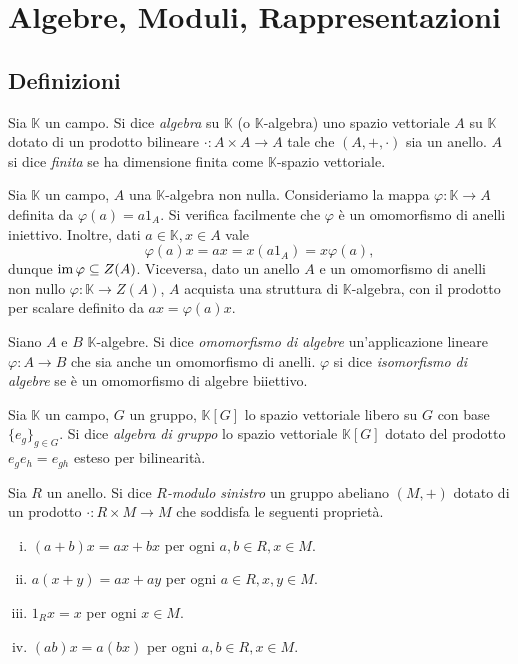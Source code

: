 \chapter{Algebre, Moduli, Rappresentazioni}

\section{Definizioni}

\begin{definition}
Sia $\mathbb{K}$ un campo. Si dice \emph{algebra} su $\mathbb{K}$ (o $\mathbb{K}$-algebra) uno spazio vettoriale $A$ su $\mathbb{K}$ dotato di un prodotto bilineare $\cdot:A\times A\to A$ tale che $(A,+,\cdot)$ sia un anello. $A$ si dice \emph{finita} se ha dimensione finita come $\mathbb{K}$-spazio vettoriale.
\end{definition}

\begin{remark}
Sia $\mathbb{K}$ un campo, $A$ una $\mathbb{K}$-algebra non nulla. Consideriamo la mappa $\varphi:\mathbb{K}\to A$ definita da $\varphi(a)=a1_A$. Si verifica facilmente che $\varphi$ è un omomorfismo di anelli iniettivo. Inoltre, dati $a\in\mathbb{K}\comma x\in A$ vale
$$
\varphi(a)x=ax=x(a1_A)=x\varphi(a),
$$
dunque $\operatorname{im}\varphi\subseteq Z(A)$. Viceversa, dato un anello $A$ e un omomorfismo di anelli non nullo $\varphi:\mathbb{K}\to Z(A)$, $A$ acquista una struttura di $\mathbb{K}$-algebra, con il prodotto per scalare definito da $ax=\varphi(a)x$.
\end{remark}

\begin{definition}
Siano $A$ e $B$ $\mathbb{K}$-algebre. Si dice \emph{omomorfismo di algebre} un'applicazione lineare $\varphi:A\to B$ che sia anche un omomorfismo di anelli. $\varphi$ si dice \emph{isomorfismo di algebre} se è un omomorfismo di algebre biiettivo.
\end{definition}

\begin{definition}
Sia $\mathbb{K}$ un campo, $G$ un gruppo, $\mathbb{K}[G]$ lo spazio vettoriale libero su $G$ con base $\{e_g\}_{g\in G}$. Si dice \emph{algebra di gruppo} lo spazio vettoriale $\mathbb{K}[G]$ dotato del prodotto $e_ge_h=e_{gh}$ esteso per bilinearità.
\end{definition}

\begin{definition}
Sia $R$ un anello. Si dice \emph{$R$-modulo sinistro} un gruppo abeliano $(M,+)$ dotato di un prodotto $\cdot:R\times M\to M$ che soddisfa le seguenti proprietà.
\begin{enumerate}[(i)]
\item $(a+b)x=ax+bx$ per ogni $a,b\in R\comma x\in M$.
\item $a(x+y)=ax+ay$ per ogni $a\in R\comma x,y\in M$.
\item $1_Rx=x$ per ogni $x\in M$.
\item $(ab)x=a(bx)$ per ogni $a,b\in R\comma x\in M$.
\end{enumerate}
\end{definition}

